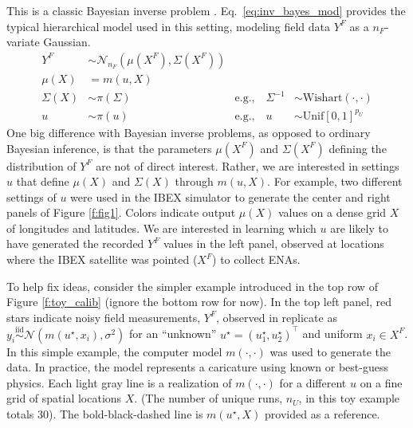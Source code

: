\documentclass[11pt]{article}
\begin{document}
This is a classic Bayesian inverse problem
\citep{kaipio2011bayesian,stuart2010inverse,knapik2011bayesian}.
Eq.~\ref{eq:inv_bayes_mod} provides the typical hierarchical model used in
this setting, {\color{red} modeling} field data $Y^F$ {\color{red}as
a $n_F$-variate Gaussian.} %
\begin{align}
Y^F &\sim \mathcal{N}_{n_F}\!\left(\mu\!\left(X^F\right),
\Sigma\!\left(X^F\right)\right) \nonumber  \\
\mu(X) &= m(u, X) \label{eq:inv_bayes_mod} \\
\Sigma(X) &\sim \pi\left(\Sigma\right) & \mbox{e.g.,} \quad \Sigma^{-1} & \sim \mathrm{Wishart}(\cdot, \cdot)
\nonumber \\
u &\sim \pi(u) & \mbox{e.g.,} \quad u &\sim \mathrm{Unif}[0,1]^{p_U} \nonumber
\end{align}
One big difference with Bayesian inverse problems, as opposed to ordinary
Bayesian inference, is that the parameters $\mu(X^F)$ and $\Sigma(X^F)$
defining the distribution of $Y^F$ are not of direct interest. Rather, we are
interested in settings $u$ that define
$\mu(X)$ and $\Sigma(X)$ through $m(u, X)$.  For example, two different
settings of $u$ were used in the IBEX simulator to generate the center and
right panels of Figure \ref{f:fig1}. Colors indicate output $\mu(X)$ values on
a dense grid $X$ of longitudes and latitudes. We are interested in learning
which $u$ are likely to have generated the recorded $Y^F$ values in the left
panel, observed at locations where the IBEX satellite was pointed ($X^F$) to
collect ENAs.

To help fix ideas, consider the simpler example introduced in the
{\color{red}top row} of Figure \ref{f:toy_calib} {\color{red} (ignore
the bottom row for now)}. {\color{red}In the top left panel,} red stars indicate noisy
field measurements, $Y^F$, observed in replicate as $y_i
\stackrel{\mathrm{iid}} \sim
\mathcal{N}(m(u^\star, x_i), \sigma^2)$ for an {\color{red}``unknown''} $u^\star =
(u_1^\star, u_2^\star)^\top$ and uniform $x_i \in X^F$.  In this simple
example, the computer model $m(\cdot, \cdot)$ was used to generate the data.
In practice, the model represents a caricature using known or best-guess
physics. Each light gray line is a realization of $m(\cdot, \cdot)$ for a
different $u$ on a fine grid of spatial locations $X$. {\color{red}(The number
of unique runs, $n_U$, in this toy example totals 30).} The bold-black-dashed
line is $m(u^\star, X)$ provided as a reference.
\end{document}
